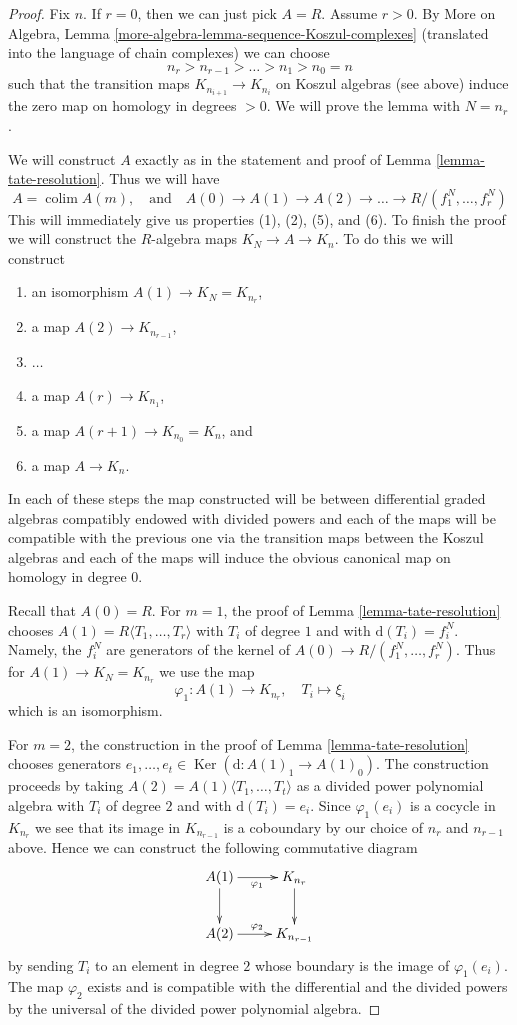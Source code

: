 \documentclass{stacks-project}
\theoremstyle{plain}
\theoremstyle{definition}
\theoremstyle{remark}
\numberwithin{equation}{subsection}
\def\colim{\mathop{\mathrm{colim}}\nolimits}
\def\Ker{\mathop{\mathrm{Ker}}}
\begin{document}
\begin{proof}
Fix $n$. If $r = 0$, then we can just pick $A = R$. Assume $r > 0$. By
More on Algebra, Lemma \ref{more-algebra-lemma-sequence-Koszul-complexes}
(translated into the language of chain complexes) we can choose
$$
n_{r} > n_{r - 1} > \ldots > n_1 > n_0 = n
$$
such that the transition maps $K_{n_{i + 1}} \to K_{n_i}$ on Koszul
algebras (see above) induce the zero map on homology in degrees $> 0$.
We will prove the lemma with $N = n_r$.

\medskip\noindent
We will construct $A$ exactly as in the statement and proof of
Lemma \ref{lemma-tate-resolution}. Thus we will have
$$
A = \colim A(m),\quad\text{and}\quad
A(0) \to A(1) \to A(2) \to \ldots \to R/(f_1^N, \ldots, f_r^N)
$$
This will immediately give us properties (1), (2), (5), and (6).
To finish the proof we will construct the $R$-algebra maps
$K_N \to A \to K_n$. To do this we will construct
\begin{enumerate}
\item an isomorphism $A(1) \to K_N = K_{n_r}$,
\item a map $A(2) \to K_{n_{r - 1}}$,
\item $\ldots$
\item a map $A(r) \to K_{n_1}$,
\item a map $A(r + 1) \to K_{n_0} = K_n$, and
\item a map $A \to K_n$.
\end{enumerate}
In each of these steps the map constructed will be between
differential graded algebras compatibly endowed with divided powers
and each of the maps will be compatible with the
previous one via the transition maps between the Koszul algebras
and each of the maps will induce the obvious canonical map
on homology in degree $0$.

\medskip\noindent
Recall that $A(0) = R$. For $m = 1$, the proof of
Lemma \ref{lemma-tate-resolution}
chooses $A(1) = R\langle T_1, \ldots, T_r\rangle$ with
$T_i$ of degree $1$ and with $\text{d}(T_i) = f_i^N$.
Namely, the $f_i^N$ are generators of the kernel of
$A(0) \to R/(f_1^N, \ldots, f_r^N)$.
Thus for $A(1) \to K_N = K_{n_r}$ we use the map
$$
\varphi_1 : A(1) \longrightarrow K_{n_r},\quad T_i \longmapsto \xi_i
$$
which is an isomorphism.

\medskip\noindent
For $m = 2$, the construction in the proof of Lemma \ref{lemma-tate-resolution}
chooses generators $e_1, \ldots, e_t \in \Ker(\text{d} : A(1)_1 \to A(1)_0)$.
The construction proceeds by taking
$A(2) = A(1)\langle T_1, \ldots, T_t\rangle$
as a divided power polynomial algebra with $T_i$ of degree $2$
and with $\text{d}(T_i) = e_i$.
Since $\varphi_1(e_i)$ is a cocycle in $K_{n_r}$
we see that its image in $K_{n_{r - 1}}$ is a coboundary by
our choice of $n_r$ and $n_{r - 1}$ above.
Hence we can construct the following commutative diagram
$$
\xymatrix{
A(1) \ar[d] \ar[r]_{\varphi_1} & K_{n_r} \ar[d] \\
A(2) \ar[r]^{\varphi_2} & K_{n_{r - 1}}
}
$$
by sending $T_i$ to an element in degree $2$ whose boundary is the
image of $\varphi_1(e_i)$. The map $\varphi_2$ exists and is compatible
with the differential and the divided powers by the universal
of the divided power polynomial algebra.


\end{proof}
\end{document}
